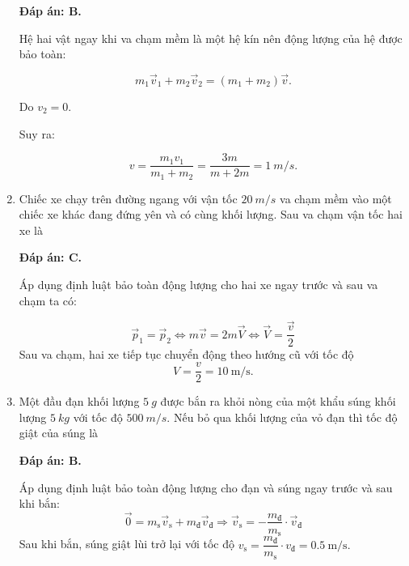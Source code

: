 \begin{enumerate}[label=\bfseries Câu \arabic*:, leftmargin=1.5cm]
	\hideall
	{	
		\textbf{Đáp án: B.}
		
		Hệ hai vật ngay khi va chạm mềm là một hệ kín nên động lượng của hệ được bảo toàn:
		
		$$m_1\vec v_1 + m_2\vec v_2 = (m_1+m_2)\vec v.$$
		
		Do $v_2 = 0.$
		
		Suy ra:
		
		$$ v = \dfrac{m_1v_1}{m_1+m_2} = \dfrac{3m}{m+2m} = \SI{1}{m/s}.$$
		
	}

	\item {}
	
	
	{Chiếc xe chạy trên đường ngang với vận tốc $\SI{20}{m/s}$ va chạm mềm vào một chiếc xe khác đang đứng yên và có cùng khối lượng. Sau va chạm vận tốc hai xe là
	}
	
	\hideall
	{	\textbf{Đáp án: C.}
		
		Áp dụng định luật bảo toàn động lượng cho hai xe ngay trước và sau va chạm ta có:
		
		$$\vec p_1 = \vec p_2 \Leftrightarrow m\vec v = 2m \vec V \Leftrightarrow \vec V = \dfrac{\vec v}{2} $$
		Sau va chạm, hai xe tiếp tục chuyển động theo hướng cũ với tốc độ
		$$V=\dfrac{v}{2}=\SI{10}{\meter/\second}.$$
	}
	\item {}
	
	
	{Một đầu đạn khối lượng $\SI{5}{g}$ được bắn ra khỏi nòng của một khẩu súng khối lượng $\SI{5}{kg}$ với tốc độ $\SI{500}{m/s}$. Nếu bỏ qua khối lượng của vỏ đạn thì tốc độ giật của súng là
	}
	
	\hideall
	{
		\textbf{Đáp án: B.}
		
Áp dụng định luật bảo toàn động lượng cho đạn và súng ngay trước và sau khi bắn:
$$\vec 0=m_\text{s}\vec v_\text{s}+m_\text{đ}\vec v_\text{đ}\Rightarrow \vec v_\text{s}=-\dfrac{m_\text{đ}}{m_\text{s}}\cdot\vec v_\text{đ}$$
Sau khi bắn, súng giật lùi trở lại với tốc độ $v_\text{s}=\dfrac{m_\text{đ}}{m_\text{s}}\cdot v_\text{đ}=\SI{0.5}{\meter/\second}.$
		
}
\end{enumerate}
